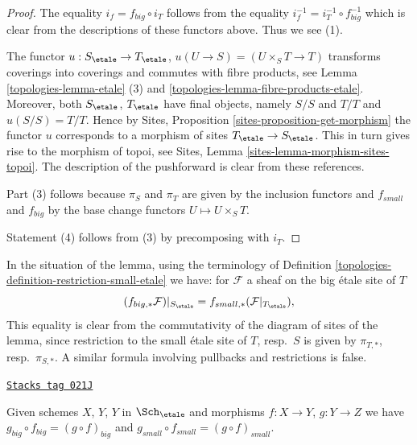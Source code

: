 \begin{proof}

The equality $i_f = f_{big} \circ i_T$ follows from the
equality $i_f^{-1} = i_T^{-1} \circ f_{big}^{-1}$ which is
clear from the descriptions of these functors above.
Thus we see (1).

\medskip\noindent
The functor
$u :
S_\etale
\to
T_\etale$, $u(U \to S) = (U \times_S T \to T)$
transforms coverings into coverings and commutes with fibre products,
see Lemma \ref{topologies-lemma-etale} (3) and \ref{topologies-lemma-fibre-products-etale}.
Moreover, both $S_\etale$, $T_\etale$ have final objects,
namely $S/S$ and $T/T$ and $u(S/S) = T/T$. Hence by
Sites, Proposition \ref{sites-proposition-get-morphism}
the functor $u$ corresponds to a morphism of sites
$T_\etale \to S_\etale$. This in turn gives rise to the
morphism of topoi, see
Sites, Lemma \ref{sites-lemma-morphism-sites-topoi}. The description
of the pushforward is clear from these references.

\medskip\noindent
Part (3) follows because $\pi_S$ and $\pi_T$ are given by the
inclusion functors and $f_{small}$ and $f_{big}$ by the
base change functors $U \mapsto U \times_S T$.

\medskip\noindent
Statement (4) follows from (3) by precomposing with $i_T$.
\end{proof}

In the situation of the lemma, using the terminology of
Definition \ref{topologies-definition-restriction-small-etale}
we have: for $\mathcal{F}$ a sheaf on the big \'etale site of $T$
$$
(f_{big, *}\mathcal{F})|_{S_\etale} =
f_{small, *}(\mathcal{F}|_{T_\etale}),
$$
This equality is clear from the commutativity of the diagram of
sites of the lemma, since restriction to the small \'etale site of
$T$, resp.\ $S$ is given by $\pi_{T, *}$, resp.\ $\pi_{S, *}$. A similar
formula involving pullbacks and restrictions is false.

\begin{lemma}
\label{topologies-lemma-composition-etale}
\href{https://stacks.math.columbia.edu/tag/021J}{\texttt{Stacks tag 021J}}

Given schemes $X$, $Y$, $Y$ in $\Sch_\etale$
and morphisms $f : X \to Y$, $g : Y \to Z$ we have
$g_{big} \circ f_{big} = (g \circ f)_{big}$ and
$g_{small} \circ f_{small} = (g \circ f)_{small}$.
\end{lemma}

